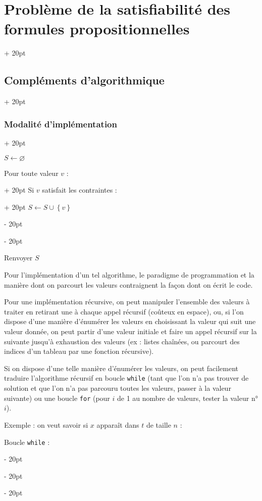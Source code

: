 \documentclass[a4paper, 12pt, twoside]{article}
\newcommand{\set}[1]{\left\{ #1 \right\}}
\newcommand{\ind}[1][20pt]{\advance\leftskip + #1}
\newcommand{\deind}[1][20pt]{\advance\leftskip - #1}
\newenvironment{indt}[2][20pt]{#2 \par \ind[#1]}{\par \deind} %
\begin{document}
\begin{indt}{\section{Problème de la satisfiabilité des formules propositionnelles}}
\begin{indt}{\subsection{Compléments d'algorithmique}}
\begin{indt}{\subsubsection{Modalité d'implémentation}}
                \begin{pseudocode}
                    $S \leftarrow \varnothing$
                    
                    \begin{indt}{Pour toute valeur $v$ :}
                        \begin{indt}{Si $v$ satisfait les contraintes :}
                            $S \leftarrow S \cup \set v$
                        \end{indt}
                    \end{indt}
                    
                    Renvoyer $S$
                \end{pseudocode}
                
                \vspace{12pt}
                
                Pour l'implémentation d'un tel algorithme, le paradigme de programmation et la manière dont on parcourt les valeurs contraignent la façon dont on écrit le code.
                
                \vspace{12pt}
                
                Pour une implémentation récursive, on peut manipuler l'ensemble des valeurs à traiter en retirant une à chaque appel récursif (coûteux en espace), ou, si l'on dispose d'une manière d'énumérer les valeurs en choisissant la valeur qui suit une valeur donnée, on peut partir d'une valeur initiale et faire un appel récursif sur la suivante jusqu'à exhaustion des valeurs (ex : listes chaînées, ou parcourt des indices d'un tableau par une fonction récursive).
                
                Si on dispose d'une telle manière d'énumérer les valeurs, on peut facilement traduire l'algorithme récursif en boucle \texttt{while} (tant que l'on n'a pas trouver de solution et que l'on n'a pas parcouru toutes les valeurs, passer à la valeur suivante) ou une boucle \texttt{for} (pour $i$ de 1 au nombre de valeurs, tester la valeur n°$i$).
                
                \vspace{12pt}
                
                Exemple : on veut savoir si $x$ apparaît dans $t$ de taille $n$ :
                
                Boucle \texttt{while} :
                

\end{indt}
\end{indt}
\end{indt}
\end{document}
